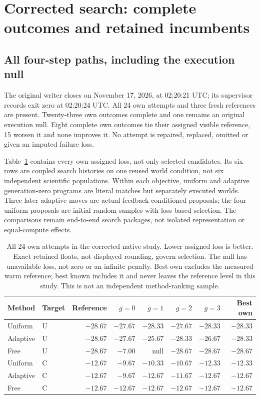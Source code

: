 \section{Corrected search: complete outcomes and retained incumbents}
\label{sec:native-corrected-choice-results}

\subsection{All four-step paths, including the execution null}
The original writer closes on November 17, 2026, at 02:20:21 UTC; its
supervisor records exit zero at 02:20:24 UTC. All 24 own attempts and three
fresh references are present. Twenty-three own outcomes complete and one
remains an original execution null. Eight complete own outcomes tie their
assigned visible reference, 15 worsen it and none improves it. No attempt is
repaired, replaced, omitted or given an imputed failure loss.

Table~\ref{tab:corrected-choice-full-paths} contains every own assigned loss,
not only selected candidates. Its six rows are coupled search histories on
one reused world condition, not six independent scientific populations.
Within each objective, uniform and adaptive generation-zero programs are
literal matches but separately executed worlds. Three later adaptive moves
are actual feedback-conditioned proposals; the four uniform proposals are
initial random samples with loss-based selection. The comparisons remain
end-to-end search packages, not isolated representation or equal-compute effects.

\begin{table}[t]
\centering\small
\setlength{\tabcolsep}{5pt}
\begin{tabular}{llrrrrrr}
\toprule
Method & Target & Reference & $g=0$ & $g=1$ & $g=2$ & $g=3$ & Best own\\
\midrule
Uniform & U & $-28.67$ & $-27.67$ & $-28.33$ & $-27.67$ & $-28.33$ & $-28.33$\\
Adaptive & U & $-28.67$ & $-27.67$ & $-25.67$ & $-28.33$ & $-26.67$ & $-28.33$\\
Free & U & $-28.67$ & $-7.00$ & null & $-28.67$ & $-28.67$ & $-28.67$\\
Uniform & C & $-12.67$ & $-9.67$ & $-10.33$ & $-10.67$ & $-12.33$ & $-12.33$\\
Adaptive & C & $-12.67$ & $-9.67$ & $-12.67$ & $-11.67$ & $-12.67$ & $-12.67$\\
Free & C & $-12.67$ & $-12.67$ & $-12.67$ & $-12.67$ & $-12.67$ & $-12.67$\\
\bottomrule
\end{tabular}
\caption{All 24 own attempts in the corrected native study. Lower assigned loss
is better. Exact retained floats, not displayed rounding, govern selection.
The null has unavailable loss, not zero or an infinite penalty. Best own excludes
the measured warm reference; best known includes it and never leaves the
reference level in this study. This is not an independent method-ranking sample.}
\label{tab:corrected-choice-full-paths}
\end{table}

